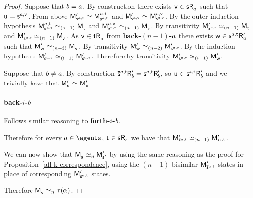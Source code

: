 \begin{proof}
    Suppose that $b = a$. 
    By construction there exists $\aStateV \in \aStateS \aAccessibility{\agentA}$ such that $\aStateU = \aPStateS[\agentA,\aStateV]$.
    From above $\aPModel[\prime]{\aStateS[\agentA,\aStateT]} \bisimilar \aPModel[\agentA,\aStateT]{\aStateS[\agentA,\aStateT]}$ and $\aPModel[\prime]{\aStateS[\agentA,\aStateV]} \bisimilar \aPModel[\agentA,\aStateV]{\aStateS[\agentA,\aStateV]}$.
    By the outer induction hypothesis $\aPModel[\agentA,\aStateT]{\aStateS[\agentA,\aStateT]} \bisimilar[(n - 1)] \aPModel{\aStateT}$ and $\aPModel[\agentA,\aStateV]{\aStateS[\agentA,\aStateV]} \bisimilar[(n - 1)] \aPModel{\aStateV}$.
    By transitivity $\aPModel[\prime]{\aStateS[\agentA,\aStateT]} \bisimilar[(n - 1)] \aPModel{\aStateT}$ and $\aPModel[\prime]{\aStateS[\agentA,\aStateV]} \bisimilar[(n - 1)] \aPModel{\aStateV}$.
    As $\aStateV \in \aStateT \aAccessibility{\agentA}$ from {\bf back-$(n - 1)$-$a$} there exists $\aStateW \in \aStateS[\agentA,\aStateT] \aAccessibility[\prime]{\agentA}$ such that $\aPModel[\prime]{\aStateW} \bisimilar[(n - 2)] \aPModel{\aStateV}$.
    By transitivity $\aPModel[\prime]{\aStateW} \bisimilar[(n - 2)] \aPModel[\prime]{\aStateS[\agentA,\aStateV]}$.
    By the induction hypothesis $\aPModel[\prime]{\aPStateS[\agentA,\aStateV]} \bisimilar[(i - 1)] \aPModel[\prime]{\aStateS[\agentA,\aStateV]}$.
    Therefore by transitivity $\aPModel[\prime]{\aPStateS[\agentA,\aStateV]} \bisimilar[(i - 1)] \aPModel[\prime]{\aStateW}$.

    Suppose that $b \neq a$.
    By construction $\aPStateS[\agentA,\aStateT] \aAccessibility[\prime]{\agentB} = \aStateS[\agentA,\aStateT] \aAccessibility[\prime]{\agentB}$, so $\aStateU \in \aStateS[\agentA,\aStateT] \aAccessibility[\prime]{\agentB}$ and we trivially have that $\aPModel[\prime]{\aStateU} \bisimilar \aPModel[\prime]{\aStateU}$.

    \paragraph{back-$i$-$b$} Follows similar reasoning to {\bf forth-$i$-$b$}.

    Therefore for every $\agentA \in \agents$, $\aStateT \in \aStateS \aAccessibility{\agentA}$ we have that $\aPModel[\prime]{\aPStateS[\agentA,\aStateT]} \bisimilar[(n - 1)] \aPModel[\prime]{\aStateS[\agentA,\aStateT]}$.

    We can now show that $\aPModel{\aStateS} \bisimilar[n] \aPModel[\prime]{\aStateS[\prime]}$ by using the same reasoning as the proof for Proposition~\ref{afl-k-correspondence}, using the $(n - 1)$-bisimilar $\aPModel[\prime]{\aPStateS[\agentA,\aStateT]}$ states in place of corresponding $\aPModel[\prime]{\aStateS[\agentA,\aStateT]}$ states.

    Therefore $\aPModel{\aStateS} \bisimilar[n] \tau(\alpha)$.
\end{proof}

